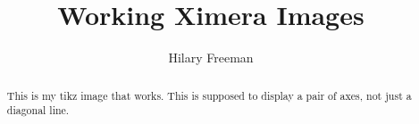 \documentclass[handout]{ximera}
\title{Working Ximera Images}
\author{Hilary Freeman}
\begin{document}
\begin{abstract}
  This is my tikz image that works.  This is supposed to display a pair of axes, not just a diagonal line.
\end{abstract}
\maketitle



\end{document}
